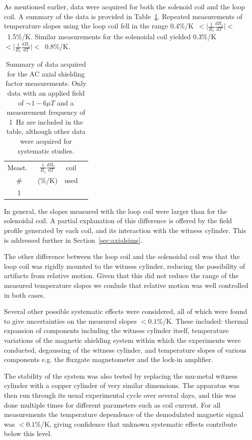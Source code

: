 As mentioned earlier, data were acquired for both the solenoid coil
and the loop coil.  A summary of the data is provided in
Table~\ref{tab:axial}.  Repeated measurements of temperature slopes
using the loop coil fell in the range
0.4\%/K~$<\vert\frac{1}{B_s}\frac{dB_s}{dT}\vert<$~1.5\%/K.  Similar
measurements for the solenoidal coil yielded
0.3\%/K~$<\vert\frac{1}{B_s}\frac{dB_s}{dT}\vert<$~0.8\%/K.

\begin{table}
\begin{center}
\begin{tabular}{cccc}
Meast.\ & $\frac{1}{B_s}\frac{dB_s}{dT}$ & coil \\
\#    & (\%/K) & used \\\hline
1 & 
\end{tabular}
\caption{Summary of data acquired for the AC axial shielding factor
  measurements.  Only data with an applied field of $\sim 1-6\mu T$ and
  a measurement frequency of 1~Hz are included in the table, although
  other data were acquired for systematic studies.\label{tab:axial}}
\end{center}
\end{table}


In general, the slopes measured with the loop coil were larger than for
the solenoidal coil.  A partial explanation of this difference is
offered by the field profile generated by each coil, and its
interaction with the witness cylinder.  This is addressed further in
Section~\ref{sec:axialsims}.

The other difference between the loop coil and the solenoidal coil was
that the loop coil was rigidly mounted to the witness cylinder,
reducing the possibility of artifacts from relative motion.  Given
that this did not reduce the range of the measured temperature slopes
we conlude that relative motion was well controlled in both cases.

Several other possible systematic effects were considered, all of
which were found to give uncertainties on the measured slopes
$<0.1\%$/K.  These included: thermal expansion of components including
the witness cylinder itself, temperature variations of the magnetic
shielding system within which the experiments were conducted,
degaussing of the witness cylinder, and temperature slopes of various
components e.g. the fluxgate magnetometer and the lock-in amplifier.

The stability of the system was also tested by replacing the mu-metal
witness cylinder with a copper cylinder of very similar dimensions.
The apparatus was then run through its usual experimental cycle over
several days, and this was done multiple times for different
parameters such as coil current.  For all measurements the temperature
dependence of the demodulated magnetic signal was $<0.1$\%/K, giving
confidence that unknown systematic effects contribute below this
level.

